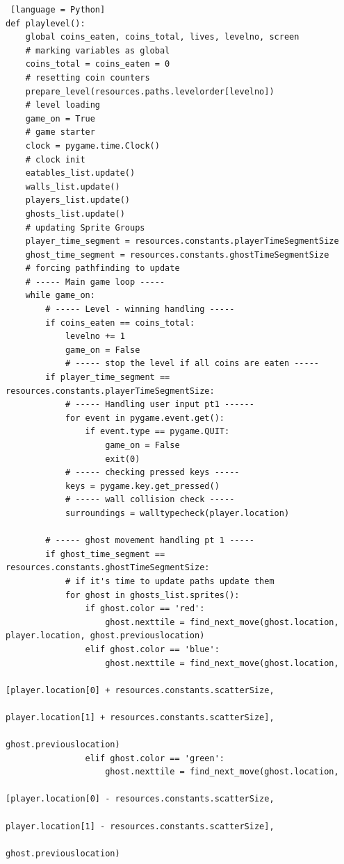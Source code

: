 \documentclass[11pt,a4paper,notitlepage]{report}
\begin{document}
\begin{lstlisting} [language = Python]
def playlevel():
    global coins_eaten, coins_total, lives, levelno, screen
    # marking variables as global
    coins_total = coins_eaten = 0
    # resetting coin counters
    prepare_level(resources.paths.levelorder[levelno])
    # level loading
    game_on = True
    # game starter
    clock = pygame.time.Clock()
    # clock init
    eatables_list.update()
    walls_list.update()
    players_list.update()
    ghosts_list.update()
    # updating Sprite Groups
    player_time_segment = resources.constants.playerTimeSegmentSize
    ghost_time_segment = resources.constants.ghostTimeSegmentSize
    # forcing pathfinding to update
    # ----- Main game loop -----
    while game_on:
        # ----- Level - winning handling -----
        if coins_eaten == coins_total:
            levelno += 1
            game_on = False
            # ----- stop the level if all coins are eaten -----
        if player_time_segment == resources.constants.playerTimeSegmentSize:
            # ----- Handling user input pt1 ------
            for event in pygame.event.get():
                if event.type == pygame.QUIT:
                    game_on = False
                    exit(0)
            # ----- checking pressed keys -----
            keys = pygame.key.get_pressed()
            # ----- wall collision check -----
            surroundings = walltypecheck(player.location)

        # ----- ghost movement handling pt 1 -----
        if ghost_time_segment == resources.constants.ghostTimeSegmentSize:
            # if it's time to update paths update them
            for ghost in ghosts_list.sprites():
                if ghost.color == 'red':
                    ghost.nexttile = find_next_move(ghost.location, player.location, ghost.previouslocation)
                elif ghost.color == 'blue':
                    ghost.nexttile = find_next_move(ghost.location,
                                                    [player.location[0] + resources.constants.scatterSize,
                                                     player.location[1] + resources.constants.scatterSize],
                                                    ghost.previouslocation)
                elif ghost.color == 'green':
                    ghost.nexttile = find_next_move(ghost.location,
                                                    [player.location[0] - resources.constants.scatterSize,
                                                     player.location[1] - resources.constants.scatterSize],
                                                    ghost.previouslocation)


\end{lstlisting}
\end{document}
